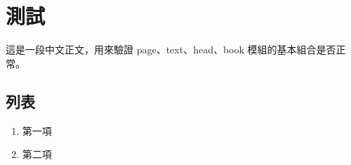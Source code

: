 \documentclass[12pt]{book}
\begin{document}
\chapter{測試}

這是一段中文正文，用來驗證 page、text、head、book 模組的基本組合是否正常。

\section{列表}

\begin{enumerate}
  \item 第一項
  \item 第二項
\end{enumerate}
\end{document}
